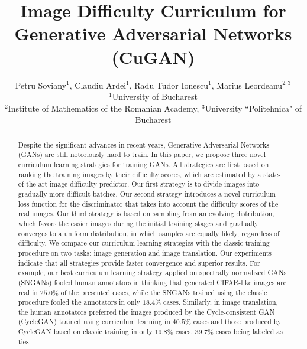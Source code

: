 \documentclass[10pt,twocolumn,letterpaper]{article}
\begin{document}
\title{Image Difficulty Curriculum for Generative Adversarial Networks (CuGAN)\vspace{-0.4cm}}

\author{Petru Soviany$^{1}$, Claudiu Ardei$^1$, Radu Tudor Ionescu$^1$, Marius Leordeanu$^{2,3}$\\
$^1$University of Bucharest\\
$^2$Institute of Mathematics of the Romanian Academy, $^3$University ``Politehnica" of Bucharest\\
\vspace{-0.8cm}
}

\maketitle



\begin{abstract}
\vspace{-0.3cm}
Despite the significant advances in recent years, Generative Adversarial Networks (GANs) are still notoriously hard to train. In this paper, we propose three novel curriculum learning strategies for training GANs. All strategies are first based on ranking the training images by their difficulty scores, which are estimated by a state-of-the-art image difficulty predictor. Our first strategy is to divide images into gradually more difficult batches. Our second strategy introduces a novel curriculum loss function for the discriminator that takes into account the difficulty scores of the real images. Our third strategy is based on sampling from an evolving distribution, which favors the easier images during the initial training stages and gradually converges to a uniform distribution, in which samples are equally likely, regardless of difficulty.
We compare our curriculum learning strategies with the classic training procedure on two tasks: image generation and image translation. Our experiments indicate that all strategies provide faster convergence and superior results. For example, our best curriculum learning strategy applied on spectrally normalized GANs (SNGANs) fooled human annotators in thinking that generated CIFAR-like images are real in $25.0\%$ of the presented cases, while the SNGANs trained using the classic procedure fooled the annotators in only $18.4\%$ cases. Similarly, in image translation, the human annotators preferred the images produced by the Cycle-consistent GAN (CycleGAN) trained using curriculum learning in $40.5\%$ cases and those produced by CycleGAN based on classic training in only $19.8\%$ cases, $39.7\%$ cases being labeled as ties.
\vspace{-0.4cm}
\end{abstract}
\end{document}
